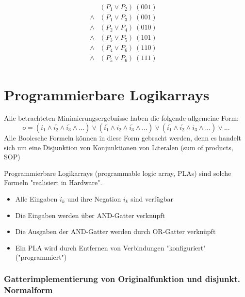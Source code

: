 \documentclass[12pt]{report}
\begin{document}
\begin{figure}[H]
  \begin{minipage}{0.4\textwidth}
    \begin{align*}
             & (P_1 \vee P_2)\ (001)   \\
      \wedge & (P_1 \vee P_3)\ (001) & \\
      \wedge & (P_2 \vee P_4)\ (010) & \\
      \wedge & (P_3 \vee P_5)\ (101) & \\
      \wedge & (P_4 \vee P_6)\ (110) & \\
      \wedge & (P_5 \vee P_6)\ (111) & \\
    \end{align*}
  \end{minipage}
\end{figure}


\section{Programmierbare Logikarrays}
Alle betrachteten Minimierungsergebnisse haben die folgende allgemeine Form:
$$o = (i_1 \wedge \overline{i_2} \wedge \overline{i_3} \wedge ...) \vee (\overline{i_1} \wedge i_2 \wedge \overline{i_3} \wedge ...) \vee (\overline{i_1} \wedge \overline{i_2} \wedge i_3 \wedge ...) \vee ... $$
Alle Boolesche Formeln können in diese Form gebracht werden, denn es handelt sich um eine Disjunktion von Konjunktionen von Literalen (sum of products, SOP)

\begin{defbox} 
  Programmierbare Logikarrays (programmable logic array, PLAs) sind solche Formeln "realisiert in Hardware".
  \begin{itemize}
    \item Alle Eingaben $i_k$ und ihre Negation $\overline{i_k}$ sind verfügbar
    \item Die Eingaben werden über AND-Gatter verknüpft
    \item Die Ausgaben der AND-Gatter werden durch OR-Gatter verknüpft
    \item Ein PLA wird durch Entfernen von Verbindungen "konfiguriert" ("programmiert")
  \end{itemize}
\end{defbox}

\subsubsection{Gatterimplementierung von Originalfunktion und disjunkt. Normalform}
\end{document}
